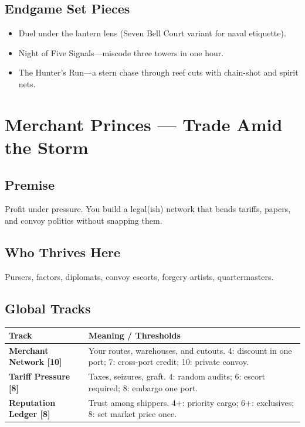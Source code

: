 \documentclass[11pt,oneside]{book}
\begin{document}
\begin{itemize}
\subsection*{Endgame Set Pieces}
\begin{itemize}[leftmargin=*,itemsep=2pt]
  \item Duel under the lantern lens (Seven Bell Court variant for naval etiquette).
  \item Night of Five Signals---miscode three towers in one hour.
  \item The Hunter's Run---a stern chase through reef cuts with chain-shot and spirit nets.
\end{itemize}

\section{\textbf{Merchant Princes} --- Trade Amid the Storm}

\subsection*{Premise}
Profit under pressure. You build a legal(ish) network that bends tariffs, papers, and convoy politics without snapping them.

\subsection*{Who Thrives Here}
Pursers, factors, diplomats, convoy escorts, forgery artists, quartermasters.

\subsection*{Global Tracks}
\begin{tabularx}{\linewidth}{@{}p{3.6cm} X@{}}
\toprule
\textbf{Track} & \textbf{Meaning / Thresholds}\\
\midrule
\textbf{Merchant Network [10]} & Your routes, warehouses, and cutouts. 4: discount in one port; 7: cross-port credit; 10: private convoy.\\
\textbf{Tariff Pressure [8]} & Taxes, seizures, graft. 4: random audits; 6: escort required; 8: embargo one port.\\
\textbf{Reputation Ledger [8]} & Trust among shippers. 4+: priority cargo; 6+: exclusives; 8: set market price once.\\
\bottomrule
\end{tabularx}


\end{itemize}
\end{document}
